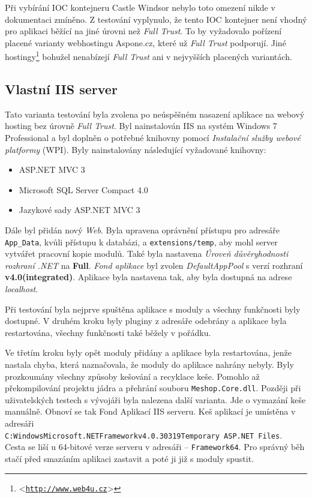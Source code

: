 \documentclass[11pt,twoside,a4paper]{book}
\let\oldUrl\url
\renewcommand\url[1]{<\texttt{\oldUrl{#1}}>}
\begin{document}
Při vybírání IOC kontejneru Castle Windsor nebylo toto omezení nikde v dokumentaci zmíněno. Z testování vyplynulo, že tento IOC kontejner není vhodný pro aplikaci běžící na jiné úrovni než \textit{Full Trust}. To by vyžadovalo pořízení placené varianty webhostingu Aspone.cz, které už \textit{Full Trust} podporují. Jiné hostingy\footnote{\url{http://www.web4u.cz}} bohužel nenabízejí \textit{Full Trust} ani v nejvyšších placených variantách.

\subsection{Vlastní IIS server}
Tato varianta testování byla zvolena po neúspěšném nasazení aplikace na webový hosting bez úrovně \textit{Full Trust}. Byl nainstalován IIS na systém Windows 7 Professional a byl doplněn o potřebné knihovny pomocí \textit{Instalační služby webové platformy} (WPI). Byly nainstalovány následující vyžadované knihovny:

\begin{itemize}
\item ASP.NET MVC 3
\item Microsoft SQL Server Compact 4.0
\item Jazykové sady ASP.NET MVC 3
\end{itemize}

Dále byl přidán nový \textit{Web}. Byla upravena oprávnění přístupu pro adresáře \texttt{App\_Data}, kvůli přístupu k databázi, a \texttt{extensions/temp}, aby mohl server vytvářet pracovní kopie modulů. Také byla nastavena \textit{Úroveň důvěryhodnosti rozhraní .NET} na \textbf{Full}. \textit{Fond aplikace} byl zvolen \textit{DefaultAppPool} s verzí rozhraní \textbf{v4.0(integrated)}. Aplikace byla nastavena tak, aby byla dostupná na adrese \textit{localhost}.

Při testování byla nejprve spuštěna aplikace s moduly a všechny funkčnosti byly dostupné. V druhém kroku byly pluginy z adresáře odebrány a aplikace byla restartována, všechny funkčnosti také běžely v pořádku.

\label{test:problem}
Ve třetím kroku byly opět moduly přidány a aplikace byla restartována, jenže nastala chyba, která naznačovala, že moduly do aplikace nahrány nebyly. Byly prozkoumány všechny způsoby kešování a recyklace keše. Pomohlo až překompilování projektu jádra a přehrání souboru \texttt{Meshop.Core.dll}. Později při uživatelských testech s vývojáři byla nalezena další varianta. Jde o vymazání keše manuálně. Obnoví se tak Fond Aplikací IIS serveru. Keš aplikací je umístěna v adresáři 
\\\texttt{C:WindowsMicrosoft.NETFrameworkv4.0.30319Temporary ASP.NET Files}. 
\\Cesta se liší u 64-bitové verze serveru v adresáři -- \texttt{Framework64}. Pro správný běh stačí před smazáním aplikaci zastavit a poté ji již s moduly spustit. 
\end{document}
